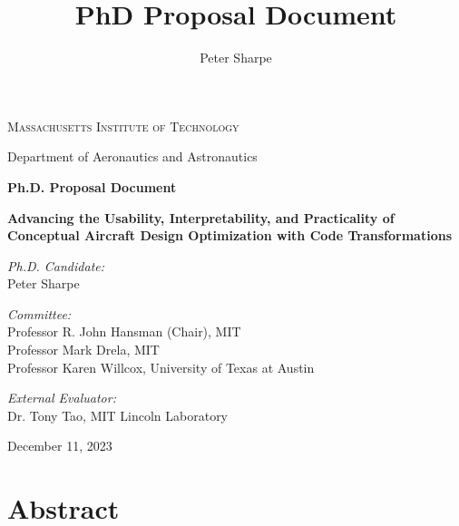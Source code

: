 \documentclass[12pt,vi,oneside]{report}
\title{PhD Proposal Document}
\author{Peter Sharpe}
\begin{document}
    \begin{center}

        \vspace*{1cm}

        \textsc{Massachusetts Institute of Technology}

        Department of Aeronautics and Astronautics

        \vspace{1cm}

        \textbf{Ph.D. Proposal Document}

        \vspace{1cm}

        \textbf{\large Advancing the Usability, Interpretability, and Practicality of Conceptual Aircraft Design Optimization with Code Transformations}
        \vspace{1cm}

        \textit{Ph.D. Candidate:}\\
        Peter Sharpe

        \vspace{1cm}

        \textit{Committee:}\\
        Professor R. John Hansman (Chair), MIT\\
        Professor Mark Drela, MIT\\
        Professor Karen Willcox, University of Texas at Austin\\

        \vspace{1cm}

        \textit{External Evaluator:}\\
        Dr. Tony Tao, MIT Lincoln Laboratory

        \vspace{3cm}

        December 11, 2023

    \end{center}

    \chapter*{Abstract}
\end{document}
